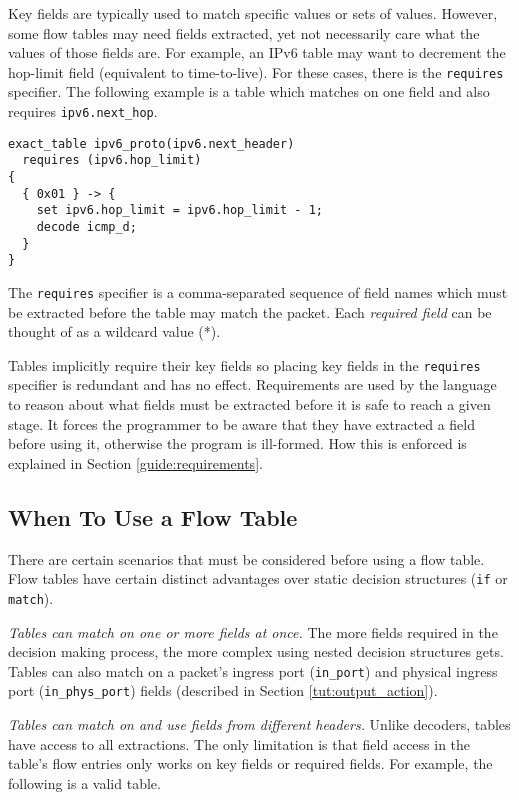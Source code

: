 Key fields are typically used to match specific values or sets of values. However, some flow tables may need fields extracted, yet not
necessarily care what the values of those fields are. 
For example, an IPv6 table
may want to decrement the hop-limit field (equivalent to time-to-live).
For these cases, there is the \texttt{requires} specifier.
The following example is a table which matches on one field and also requires
\texttt{ipv6.next\_hop}.

\begin{codepage}
\begin{lstlisting}
exact_table ipv6_proto(ipv6.next_header)
  requires (ipv6.hop_limit) 
{
  { 0x01 } -> {
  	set ipv6.hop_limit = ipv6.hop_limit - 1; 
  	decode icmp_d;
  }
}
\end{lstlisting}
\end{codepage}

The \texttt{requires} specifier is a comma-separated sequence of field names
which must be extracted before the table may match the packet.
Each \textit{required field} can be thought of as a wildcard value (*).

Tables implicitly require their key fields so placing key fields
in the \texttt{requires} specifier is redundant and has no effect. 
Requirements are used by the language to reason about what
fields must be extracted before it is safe to reach a given stage.
It forces the programmer to be aware that they have extracted
a field before using it, otherwise the program is ill-formed. 
How this is enforced is explained in Section \ref{guide:requirements}.

\subsection{When To Use a Flow Table} \label{tut:why_tables}

There are certain scenarios that must be considered before using a
flow table. Flow tables have certain distinct advantages over
static decision structures (\texttt{if} or \texttt{match}).

\textit{Tables can match on one or more fields at once.} The more fields
required in the decision making process, the more complex using nested decision
structures gets. Tables can also match on a packet's ingress port
(\texttt{in\_port}) and physical ingress port (\texttt{in\_phys\_port}) fields
(described in Section \ref{tut:output_action}).

\textit{Tables can match on and use fields from different headers.} Unlike
decoders, tables have access to all extractions. The only limitation is that
field access in the table's flow entries only works on key fields or required fields. For example, the
following is a valid table.

